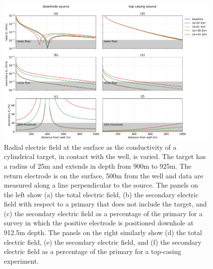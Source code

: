 \begin{figure}
    \begin{center}
    \includegraphics[width=\textwidth]{figures/dc_casing/target_electric_fields.png}
    \end{center}
\caption{
    Radial electric field at the surface as the conductivity of a cylindrical target, in contact with the well,
    is varied. The target has a radius of 25m and extends in depth from 900m to 925m. The return electrode
    is on the surface, 500m from the well and data are measured along a line perpendicular to the source.
    The panels on the left show
    (a) the total electric field, (b) the secondary electric field with respect to a primary that does not include the target,
    and (c) the secondary electric field as a percentage of the primary for a survey in which the positive electrode is
    positioned downhole at 912.5m depth. The panels on the right similarly show (d) the total electric field, (e) the
    secondary electric field, and (f) the secondary electric field as a percentage of the primary for a top-casing experiment.
}
\label{fig:target_electric_fields}
\end{figure}
